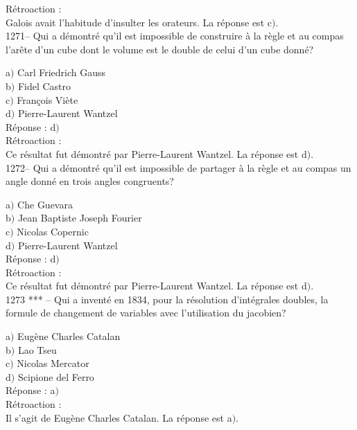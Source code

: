 ﻿\documentclass[letterpaper, 12pt]{article}
\begin{document}
R\'etroaction : \\
Galois avait l'habitude d'insulter les orateurs.
La r\'eponse est c$)$.\\

1271-- Qui a d\'emontr\'e qu'il est impossible de construire \`a la
r\`egle et au compas l'ar\^ete d'un cube dont le volume est le
double de celui d'un cube donn\'e?

a$)$ Carl Friedrich Gauss \\
b$)$ Fidel Castro \\
c$)$ Fran\c cois Vi\`ete \\
d$)$ Pierre-Laurent Wantzel\\

R\'eponse : d$)$\\

R\'etroaction : \\
Ce r\'esultat fut d\'emontr\'e par Pierre-Laurent Wantzel.
La r\'eponse est d$)$.\\

1272-- Qui a d\'emontr\'e qu'il est impossible de partager \`a la
r\`egle et au compas un angle donn\'e en trois angles congruents?

a$)$ Che Guevara \\
b$)$ Jean Baptiste Joseph Fourier \\
c$)$ Nicolas Copernic \\
d$)$ Pierre-Laurent Wantzel\\

R\'eponse : d$)$\\

R\'etroaction : \\
Ce r\'esultat fut d\'emontr\'e par Pierre-Laurent Wantzel.
La r\'eponse est d$)$.\\

1273 *** -- Qui a invent\'e en 1834, pour la r\'esolution
d'int\'egrales doubles, la formule de changement de variables avec
l'utilisation du jacobien?

a$)$ Eug\`ene Charles Catalan \\
b$)$ Lao Tseu \\
c$)$ Nicolas Mercator \\
d$)$ Scipione del Ferro\\

R\'eponse : a$)$\\

R\'etroaction : \\
Il s'agit de Eug\`ene Charles Catalan.
La r\'eponse est a$)$.\\
\end{document}

